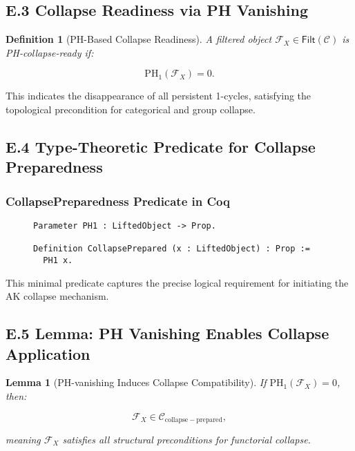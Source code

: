 \documentclass[11pt]{article}
\newtheorem{definition}[theorem]{Definition}
\newtheorem{lemma}[theorem]{Lemma}
\begin{document}
\subsection*{E.3 Collapse Readiness via PH Vanishing}

\begin{definition}[PH-Based Collapse Readiness]
A filtered object \( \mathcal{F}_X \in \mathsf{Filt}(\mathcal{C}) \) is \emph{PH-collapse-ready} if:

\[
\mathrm{PH}_1(\mathcal{F}_X) = 0.
\]
\end{definition}

This indicates the disappearance of all persistent 1-cycles, satisfying the topological precondition for categorical and group collapse.

\subsection*{E.4 Type-Theoretic Predicate for Collapse Preparedness}

\subsubsection*{CollapsePreparedness Predicate in Coq}

\begin{figure}[h]
\centering
\begin{lstlisting}[language=Coq, caption=Persistent Homology Based Collapse Preparedness]
Parameter PH1 : LiftedObject -> Prop.

Definition CollapsePrepared (x : LiftedObject) : Prop :=
  PH1 x.
\end{lstlisting}
\end{figure}

This minimal predicate captures the precise logical requirement for initiating the AK collapse mechanism.

\subsection*{E.5 Lemma: PH Vanishing Enables Collapse Application}

\begin{lemma}[PH-vanishing Induces Collapse Compatibility]
If \( \mathrm{PH}_1(\mathcal{F}_X) = 0 \), then:

\[
\mathcal{F}_X \in \mathcal{C}_{\mathrm{collapse-prepared}},
\]

meaning \( \mathcal{F}_X \) satisfies all structural preconditions for functorial collapse.
\end{lemma}
\end{document}
